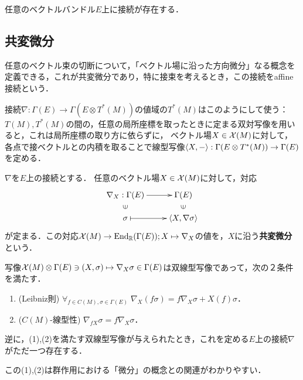 \documentclass[uplatex,dvipdfmx]{jsreport}
\begin{document}
\begin{theorem}
    任意のベクトルバンドル$E$上に接続が存在する．
\end{theorem}


\subsection{共変微分}

\begin{tcolorbox}[colframe=ForestGreen, colback=ForestGreen!10!white,breakable,colbacktitle=ForestGreen!40!white,coltitle=black,fonttitle=\bfseries\sffamily,
title=]
    任意のベクトル束の切断について，「ベクトル場に沿った方向微分」なる概念を定義できる，これが共変微分であり，特に接束を考えるとき，この接続をaffine接続という．
\end{tcolorbox}

\begin{discussion}
    接続$\nabla:\Gamma(E)\to\Gamma(E\otimes T^*(M))$の値域の$T^*(M)$はこのようにして使う：
    $T(M),T^*(M)$の間の，任意の局所座標を取ったときに定まる双対写像を用いると，これは局所座標の取り方に依らずに，
    ベクトル場$X\in\mathcal{X}(M)$に対して，
    各点で接ベクトルとの内積を取ることで線型写像$\langle X,-\rangle:\Gamma(E\otimes T^*(M))\to\Gamma(E)$を定める．
\end{discussion}

\begin{definition}[接続の定める共変微分]
    $\nabla$を$E$上の接続とする．
    任意のベクトル場$X\in\mathcal{X}(M)$に対して，対応
    \[\xymatrix@R-2pc{
        \nabla_X:\Gamma(E)\ar[r]&\Gamma(E)\\
        \rotatebox[origin=c]{90}{$\in$}&\rotatebox[origin=c]{90}{$\in$}\\
        \sigma\ar@{|->}[r]&\brac{X,\nabla\sigma}
    }\]
    が定まる．この対応$\mathcal{X}(M)\to\mathrm{End}_{\mathbb{R}}(\Gamma(E));X\mapsto\nabla_X$の値を，$X$に沿う\textbf{共変微分}という．
\end{definition}

\begin{theorem}
    写像$\mathcal{X}(M)\otimes\Gamma(E)\ni(X,\sigma)\mapsto\nabla_X\sigma\in\Gamma(E)$は双線型写像であって，次の２条件を満たす．
    \begin{enumerate}
        \item (Leibniz則) $\forall_{f\in C(M),\sigma\in\Gamma(E)}\;\nabla_X(f\sigma)=f\nabla_X\sigma+X(f)\sigma$．
        \item ($C(M)$-線型性) $\nabla_{fX}\sigma=f\nabla_X\sigma$．
    \end{enumerate}
    逆に，(1),(2)を満たす双線型写像が与えられたとき，これを定める$E$上の接続$\nabla$がただ一つ存在する．
\end{theorem}
\begin{remarks}
    この(1),(2)は群作用における「微分」の概念との関連がわかりやすい．
\end{remarks}
\end{document}
